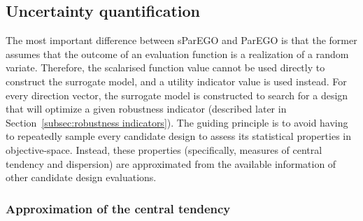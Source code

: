 \documentclass{llncs}
\begin{document}
\subsection{Uncertainty quantification}\label{subsec:Uncertainty quantification}

The most important difference between sParEGO and ParEGO is that the former assumes that the outcome of an evaluation function is a realization of a random variate. Therefore, the scalarised function value cannot be used directly to construct the surrogate model, and a utility indicator value is used instead. For every direction vector, the surrogate model is constructed to search for a design that will optimize a given robustness indicator (described later in Section~\ref{subsec:robustness indicators}). The guiding principle is to avoid having to repeatedly sample every candidate design to assess its statistical properties in objective-space. Instead, these properties (specifically, measures of central tendency and dispersion) are approximated from the available information of other candidate design evaluations.

\subsubsection{Approximation of the central tendency}
\end{document}
